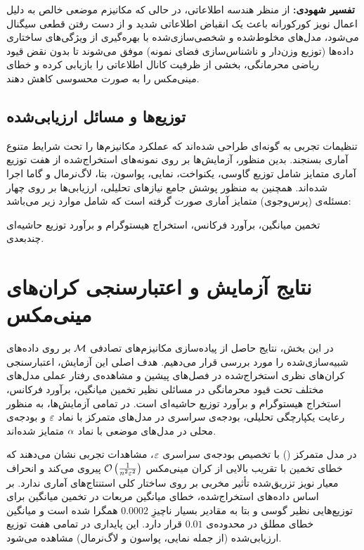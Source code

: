 \textbf{تفسیر شهودی:} از منظر هندسه اطلاعاتی، در حالی که مکانیزم موضعی خالص به دلیل اعمال نویز کورکورانه باعث یک انقباض اطلاعاتی شدید و از دست رفتن قطعی سیگنال می‌شود، مدل‌های مخلوط‌شده و شخصی‌سازی‌شده با بهره‌گیری از ویژگی‌های ساختاری داده‌ها (توزیع وزن‌دار و ناشناس‌سازی فضای نمونه) موفق می‌شوند تا بدون نقض قیود ریاضی محرمانگی، بخشی از ظرفیت کانال اطلاعاتی را بازیابی کرده و خطای مینی‌مکس را به صورت محسوسی کاهش دهند.

\subsection{توزیع‌ها و مسائل ارزیابی‌شده}
تنظیمات تجربی به گونه‌ای طراحی شده‌اند که عملکرد مکانیزم‌ها را تحت شرایط متنوع آماری بسنجند. بدین منظور، آزمایش‌ها بر روی نمونه‌های استخراج‌شده از هفت توزیع آماری متمایز شامل توزیع گاوسی، یکنواخت، نمایی، پواسون، بتا، ‌لاگ‌نرمال و گاما اجرا شده‌اند. همچنین به منظور پوشش جامع نیازهای تحلیلی، ارزیابی‌ها بر روی چهار مسئله‌ی (پرس‌وجوی) متمایز آماری صورت گرفته است که شامل موارد زیر می‌باشد:

تخمین میانگین، برآورد فرکانس، استخراج هیستوگرام و برآورد توزیع حاشیه‌ای چندبعدی.


\section{نتایج آزمایش و اعتبارسنجی کران‌های مینی‌مکس}
\label{sec:sim-results}

در این بخش، نتایج حاصل از پیاده‌سازی مکانیزم‌های تصادفی $\mech$ بر روی داده‌های شبیه‌سازی‌شده را مورد بررسی قرار می‌دهیم. هدف اصلی این آزمایش، اعتبارسنجی کران‌های نظری استخراج‌شده در فصل‌های پیشین و مشاهده‌ی رفتار عملی مدل‌های مختلف تحت قیود محرمانگی در مسائلی نظیر تخمین میانگین، برآورد فرکانس، استخراج هیستوگرام و برآورد توزیع حاشیه‌ای است. در تمامی آزمایش‌ها، به منظور رعایت یکپارچگی تحلیلی، بودجه‌ی سراسری در مدل‌های متمرکز با نماد $\varepsilon$ و بودجه‌ی محلی در مدل‌های موضعی با نماد $\alpha$ متمایز شده‌اند.

در مدل متمرکز () با تخصیص بودجه‌ی سراسری $\varepsilon$، مشاهدات تجربی نشان می‌دهند که خطای تخمین با تقریب بالایی از کران مینی‌مکس $\mathcal{O}\left( \frac{1}{n^2 \varepsilon^2} \right)$ پیروی می‌کند و انحراف معیار نویز تزریق‌شده تأثیر مخربی بر روی ساختار کلی استنتاج‌های آماری ندارد. بر اساس داده‌های استخراج‌شده، خطای میانگین مربعات در تخمین میانگین برای توزیع‌هایی نظیر گوسی و بتا به مقادیر بسیار ناچیزِ $0.0002$ همگرا شده است و میانگین خطای مطلق در محدوده‌ی $0.01$ قرار دارد. این پایداری در تمامی هفت توزیع ارزیابی‌شده (از جمله نمایی، پواسون و لاگ‌نرمال) مشاهده می‌شود. 

